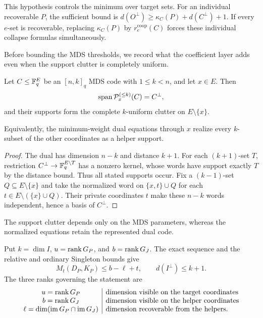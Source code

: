 This hypothesis controls the minimum over target sets.  For an individual
recoverable $P$, the sufficient bound is
$d(O^\perp)\geq\kappa_C(P)+d(C^\perp)+1$.
If every $e$-set is recoverable, replacing $\kappa_C(P)$ by
$r_e^{\mathrm{coop}}(C)$ forces these individual collapse formulas
simultaneously.

Before bounding the MDS thresholds, we record what the coefficient layer adds
even when the support clutter is completely uniform.

\begin{theorem}
\label{thm:mds-reconstruction}
%
Let $C\leq\mathbb F_q^E$ be an $[n,k]_q$ MDS code with $1\leq k<n$, and let
$x\in E$.  Then
\[
 \operatorname{span}\mathcal P_x^{(\leq k)}(C)=C^\perp,
\]
and their supports form the complete $k$-uniform clutter on
$E\setminus\{x\}$.
\end{theorem}

Equivalently, the minimum-weight dual equations through $x$ realize every
$k$-subset of the other coordinates as a helper support.

\begin{proof}
The dual has dimension $n-k$ and distance $k+1$.  For each $(k+1)$-set $T$,
restriction $C^\perp\to\mathbb F_q^{E\setminus T}$ has a nonzero kernel, whose words
have support exactly $T$ by the distance bound.  Thus all stated supports
occur.  Fix a $(k-1)$-set $Q\subseteq E\setminus\{x\}$ and take the normalized
word on $\{x,t\}\cup Q$ for each
$t\in E\setminus(\{x\}\cup Q)$.  Their private coordinates $t$ make these
$n-k$ words independent, hence a basis of $C^\perp$.
%
\end{proof}

The support clutter depends only on the MDS parameters, whereas the normalized
equations retain the represented dual code.

Put $k=\dim I$, $u=\operatorname{rank} G_P$, and $b=\operatorname{rank} G_J$.  The exact sequence and the relative and
ordinary Singleton bounds give
\begin{equation}
 M_t(D_P,K_P)\leq b-\ell+t,
 \qquad d(I^\perp)\leq k+1.
 \label{eq:singleton-bounds}
\end{equation}
The three ranks governing the statement are
\[
\begin{array}{c|l}
 u=\operatorname{rank} G_P & \text{dimension visible on the target coordinates}\\
 b=\operatorname{rank} G_J & \text{dimension visible on the helper coordinates}\\
 \ell=\dim(\operatorname{im}G_P\cap\operatorname{im}G_J)
   & \text{dimension recoverable from the helpers.}
\end{array}
\]

